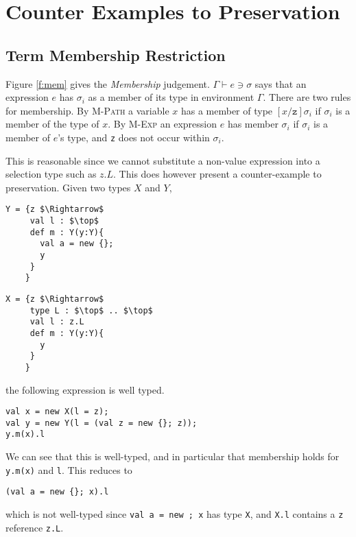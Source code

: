 \documentclass{llncs}
\numberwithin{subcase}{casethm}
\numberwithin{casethm}{theorem}
\numberwithin{casethm}{lemma}
\begin{document}
\section{Counter Examples to Preservation}
	\label{s:examples}

\subsection{Term Membership Restriction}
	\label{s:term_mem}
Figure \ref{f:mem} gives the \emph{Membership} judgement. 
$\Gamma \vdash e \ni \sigma$ says that an expression $e$ 
has $\sigma_i$ as a member of its type in environment $\Gamma$. 
There are two rules for membership. By \textsc{M-Path} a 
variable $x$ has a member of type $[x/\texttt{z}]\sigma_i$ 
if $\sigma_i$ is a member of the type of $x$. By \textsc{M-Exp}
an expression $e$ has member $\sigma_i$ if $\sigma_i$ is 
a member of $e$'s type, and \texttt{z} does not occur 
within $\sigma_i$.

This is reasonable since we cannot substitute a non-value 
expression into a selection type such as $z.L$. 
This does however present a counter-example to preservation. 
Given two types $X$ and $Y$,

\begin{lstlisting}[mathescape, style=custom_lang]
Y = {z $\Rightarrow$
     val l : $\top$
     def m : Y(y:Y){
       val a = new {};
       y
     }
    }
\end{lstlisting}
\begin{lstlisting}[mathescape, style=custom_lang]
X = {z $\Rightarrow$
     type L : $\top$ .. $\top$
     val l : z.L
     def m : Y(y:Y){
       y
     }
    }
\end{lstlisting}

the following expression is well typed.
\begin{lstlisting}[mathescape, style=custom_lang]
val x = new X(l = z);
val y = new Y(l = (val z = new {}; z));
y.m(x).l
\end{lstlisting}
We can see that this is well-typed, and in particular that membership 
holds for \texttt{y.m(x)} and \texttt{l}. This reduces to 
\begin{lstlisting}[mathescape, style=custom_lang]
(val a = new {}; x).l
\end{lstlisting}
which is not well-typed since \texttt{val a = new {}; x} has type 
\texttt{X}, and \texttt{X.l} contains a \texttt{z} reference 
\texttt{z.L}.
\end{document}
